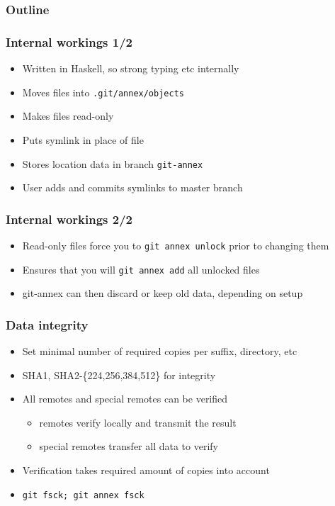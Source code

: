 \documentclass[t]{beamer}
\begin{document}
\begin{frame}
	\frametitle{Outline}
	\tableofcontents[currentsection]
\end{frame}

\begin{frame}
	\frametitle{Internal workings 1/2}
	\begin{itemize}
		\item Written in Haskell, so strong typing etc internally
		\item Moves files into \texttt{.git/annex/objects}
		\item Makes files read-only
		\item Puts symlink in place of file
		\item Stores location data in branch \texttt{git-annex}
		\item User adds and commits symlinks to master branch
	\end{itemize}
\end{frame}

\begin{frame}
	\frametitle{Internal workings 2/2}
	\begin{itemize}
		\item Read-only files force you to \texttt{git annex unlock} prior to changing them
		\item Ensures that you will \texttt{git annex add} all unlocked files
		\item git-annex can then discard or keep old data, depending on setup
	\end{itemize}
\end{frame}

\begin{frame}
	\frametitle{Data integrity}
	\begin{itemize}
		\item Set minimal number of required copies per suffix, directory, etc
		\item SHA1, SHA2-\{224,256,384,512\} for integrity
		\item All remotes and special remotes can be verified
		\begin{itemize}
			\item remotes verify locally and transmit the result
			\item special remotes transfer all data to verify
		\end{itemize}
		\item Verification takes required amount of copies into account
		\item \texttt{git fsck; git annex fsck}
	\end{itemize}
\end{frame}
\end{document}
